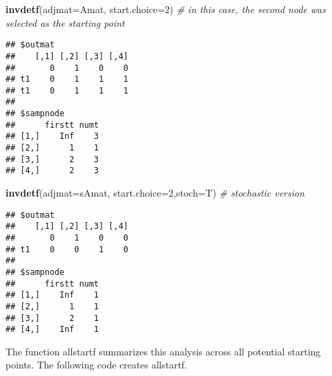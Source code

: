\documentclass[]{article}
\newenvironment{Shaded}{\begin{snugshade}}{\end{snugshade}}
\newcommand{\KeywordTok}[1]{\textcolor[rgb]{0.13,0.29,0.53}{\textbf{#1}}}
\newcommand{\DataTypeTok}[1]{\textcolor[rgb]{0.13,0.29,0.53}{#1}}
\newcommand{\DecValTok}[1]{\textcolor[rgb]{0.00,0.00,0.81}{#1}}
\newcommand{\StringTok}[1]{\textcolor[rgb]{0.31,0.60,0.02}{#1}}
\newcommand{\CommentTok}[1]{\textcolor[rgb]{0.56,0.35,0.01}{\textit{#1}}}
\newcommand{\ControlFlowTok}[1]{\textcolor[rgb]{0.13,0.29,0.53}{\textbf{#1}}}
\newcommand{\OperatorTok}[1]{\textcolor[rgb]{0.81,0.36,0.00}{\textbf{#1}}}
\newcommand{\NormalTok}[1]{#1}
\begin{document}
\begin{Shaded}
\begin{Highlighting}[]
\KeywordTok{invdetf}\NormalTok{(}\DataTypeTok{adjmat=}\NormalTok{Amat, }\DataTypeTok{start.choice=}\DecValTok{2}\NormalTok{) }\CommentTok{# in this case, the second node was selected as the starting point}
\end{Highlighting}
\end{Shaded}

\begin{verbatim}
## $outmat
##    [,1] [,2] [,3] [,4]
##       0    1    0    0
## t1    0    1    1    1
## t1    0    1    1    1
## 
## $sampnode
##      firstt numt
## [1,]    Inf    3
## [2,]      1    1
## [3,]      2    3
## [4,]      2    3
\end{verbatim}

\begin{Shaded}
\begin{Highlighting}[]
\KeywordTok{invdetf}\NormalTok{(}\DataTypeTok{adjmat=}\NormalTok{sAmat, }\DataTypeTok{start.choice=}\DecValTok{2}\NormalTok{,}\DataTypeTok{stoch=}\NormalTok{T) }\CommentTok{# stochastic version}
\end{Highlighting}
\end{Shaded}

\begin{verbatim}
## $outmat
##    [,1] [,2] [,3] [,4]
##       0    1    0    0
## t1    0    0    1    0
## 
## $sampnode
##      firstt numt
## [1,]    Inf    1
## [2,]      1    1
## [3,]      2    1
## [4,]    Inf    1
\end{verbatim}

The function allstartf summarizes this analysis across all potential
starting points. The following code creates allstartf.

\begin{Shaded}
\end{Shaded}
\end{document}
